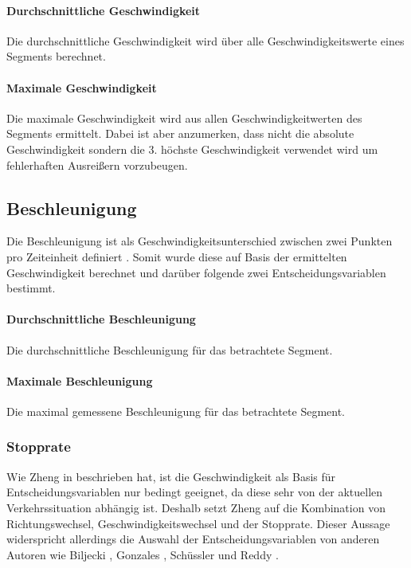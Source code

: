 \paragraph{Durchschnittliche Geschwindigkeit} Die durchschnittliche Geschwindigkeit wird über alle Geschwindigkeitswerte eines Segments berechnet.

\paragraph{Maximale Geschwindigkeit} Die maximale Geschwindigkeit wird aus allen Geschwindigkeitwerten des Segments ermittelt. Dabei ist aber anzumerken, dass nicht die absolute Geschwindigkeit sondern die 3. höchste Geschwindigkeit verwendet wird um fehlerhaften Ausreißern vorzubeugen.

\subsection{Beschleunigung}
Die Beschleunigung ist als Geschwindigkeitsunterschied zwischen zwei Punkten pro Zeiteinheit definiert \cite[S.~51]{douglas_giancoli_physik_2010}. Somit wurde diese auf Basis der ermittelten Geschwindigkeit berechnet und darüber folgende zwei Entscheidungsvariablen bestimmt. 

\paragraph{Durchschnittliche Beschleunigung} Die durchschnittliche Beschleunigung für das betrachtete Segment. 

\paragraph{Maximale Beschleunigung} Die maximal gemessene Beschleunigung für das betrachtete Segment.

\subsubsection{Stopprate}
Wie Zheng in \cite{zheng_understanding_2010} beschrieben hat, ist die Geschwindigkeit als Basis für Entscheidungsvariablen nur bedingt geeignet, da diese sehr von der aktuellen Verkehrssituation abhängig ist. Deshalb setzt Zheng auf die Kombination von Richtungswechsel, Geschwindigkeitswechsel und der Stopprate. Dieser Aussage widerspricht allerdings die Auswahl der Entscheidungsvariablen von anderen Autoren wie Biljecki  \cite{biljecki_transportation_2013}, Gonzales \cite{gonzalez_automating_2010}, Schüssler \cite{nadine_schussler_improving_2011} und Reddy \cite{reddy_using_2010}. 

